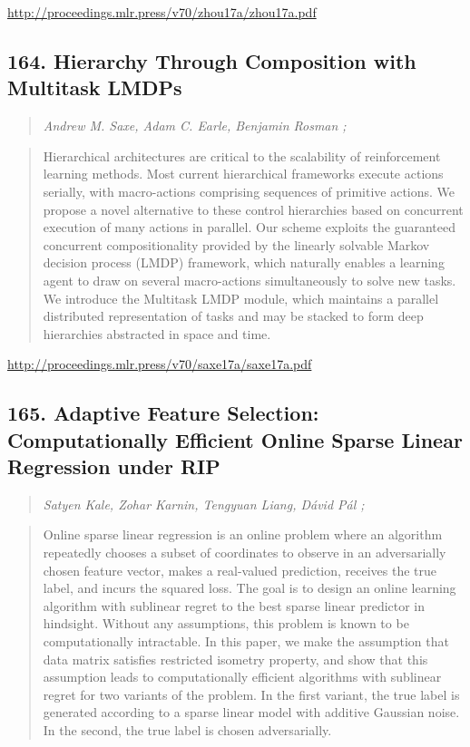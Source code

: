 \documentclass{article}
\begin{document}
\href{http://proceedings.mlr.press/v70/zhou17a/zhou17a.pdf}{http://proceedings.mlr.press/v70/zhou17a/zhou17a.pdf}

\subsection{164. Hierarchy Through Composition with Multitask LMDPs}

\begin{quote}
\footnotesize{\textit{Andrew M. Saxe, Adam C. Earle, Benjamin Rosman ;}}
\end{quote}

\begin{quote}
    Hierarchical architectures are critical to the scalability of reinforcement learning methods. Most current hierarchical frameworks execute actions serially, with macro-actions comprising sequences of primitive actions. We propose a novel alternative to these control hierarchies based on concurrent execution of many actions in parallel. Our scheme exploits the guaranteed concurrent compositionality provided by the linearly solvable Markov decision process (LMDP) framework, which naturally enables a learning agent to draw on several macro-actions simultaneously to solve new tasks. We introduce the Multitask LMDP module, which maintains a parallel distributed representation of tasks and may be stacked to form deep hierarchies abstracted in space and time.  \end{quote}

\href{http://proceedings.mlr.press/v70/saxe17a/saxe17a.pdf}{http://proceedings.mlr.press/v70/saxe17a/saxe17a.pdf}

\subsection{165. Adaptive Feature Selection: Computationally Efficient Online Sparse Linear Regression under RIP}

\begin{quote}
\footnotesize{\textit{Satyen Kale, Zohar Karnin, Tengyuan Liang, Dávid Pál ;}}
\end{quote}

\begin{quote}
    Online sparse linear regression is an online problem where an algorithm repeatedly chooses a subset of coordinates to observe in an adversarially chosen feature vector, makes a real-valued prediction, receives the true label, and incurs the squared loss. The goal is to design an online learning algorithm with sublinear regret to the best sparse linear predictor in hindsight. Without any assumptions, this problem is known to be computationally intractable. In this paper, we make the assumption that data matrix satisfies restricted isometry property, and show that this assumption leads to computationally efficient algorithms with sublinear regret for two variants of the problem. In the first variant, the true label is generated according to a sparse linear model with additive Gaussian noise. In the second, the true label is chosen adversarially.  \end{quote}
\end{document}
